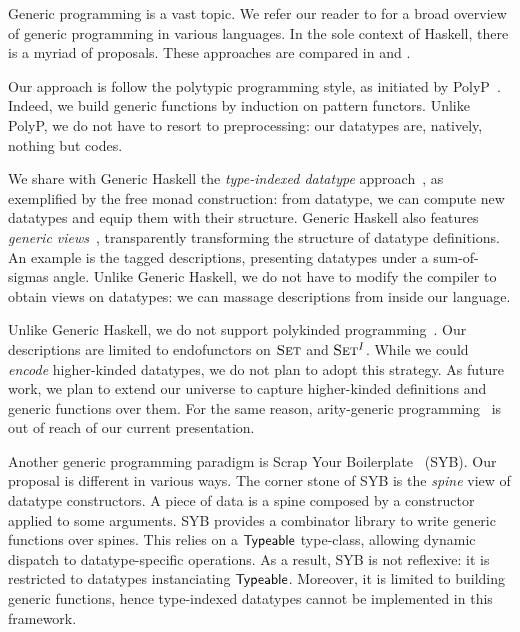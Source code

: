 Generic programming is a vast topic. We refer our reader to
\citet{garcia:generic-comparative-study} for a broad overview of
generic programming in various languages. In the sole context of
Haskell, there is a myriad of proposals. These approaches are compared
in \citet{hinze:generic-approach-comparative} and
\citet{rodriguez:generic-libs-comparative}.

Our approach is follow the polytypic programming style, as initiated
by PolyP~\cite{jansson:polyp}. Indeed, we build generic functions by
induction on pattern functors. Unlike PolyP, we do not have to resort
to preprocessing: our datatypes are, natively, nothing but codes.

We share with Generic Haskell the \emph{type-indexed datatype}
approach~\cite{hinze:generic-haskell}, as exemplified by the free
monad construction: from datatype, we can compute new datatypes and
equip them with their structure. Generic Haskell also features
\emph{generic views}~\cite{holdermans:generic-view}, transparently
transforming the structure of datatype definitions. An example is the
tagged descriptions, presenting datatypes under a sum-of-sigmas
angle. Unlike Generic Haskell, we do not have to modify the compiler
to obtain views on datatypes: we can massage descriptions from inside
our language.

Unlike Generic Haskell, we do not support polykinded
programming~\cite{hinze:polytypic-polykinded}. Our descriptions are
limited to endofunctors on $\Set$ and $\Set^I$. While we could
\emph{encode} higher-kinded datatypes, we do not plan to adopt this
strategy. As future work, we plan to extend our universe to capture
higher-kinded definitions and generic functions over them. For the
same reason, arity-generic programming~\cite{weirich:arity-generic} is
out of reach of our current presentation.

Another generic programming paradigm is Scrap Your
Boilerplate~\cite{spj:syb} (SYB). Our proposal is different in various
ways. The corner stone of SYB is the \emph{spine} view of datatype
constructors. A piece of data is a spine composed by a constructor
applied to some arguments. SYB provides a combinator library to write
generic functions over spines. This relies on a $\textsf{Typeable}$
type-class, allowing dynamic dispatch to datatype-specific
operations. As a result, SYB is not reflexive: it is restricted to
datatypes instanciating $\textsf{Typeable}$. Moreover, it is limited to
building generic functions, hence type-indexed datatypes cannot be
implemented in this framework.


